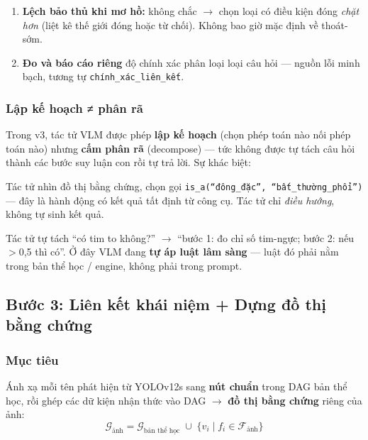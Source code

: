 \documentclass[11pt,a4paper]{article}
\begin{document}
\begin{enumerate}[leftmargin=1.5em]
  \item \textbf{Lệch bảo thủ khi mơ hồ:} không chắc $\to$ chọn loại có điều kiện đóng \emph{chặt hơn} (liệt kê thế giới đóng hoặc từ chối). Không bao giờ mặc định về thoát-sớm.
  \item \textbf{Đo và báo cáo riêng} độ chính xác phân loại loại câu hỏi --- nguồn lỗi minh bạch, tương tự \texttt{chính\_xác\_liên\_kết}.
\end{enumerate}

\subsubsection{Lập kế hoạch ≠ phân rã}
Trong v3, tác tử VLM được phép \textbf{lập kế hoạch} (chọn phép toán nào nối phép toán nào) nhưng \textbf{cấm phân rã} (decompose) --- tức không được tự tách câu hỏi thành các bước suy luận con rồi tự trả lời. Sự khác biệt:

\begin{description}[leftmargin=1.5em, style=nextline]
  \item[Lập kế hoạch trên đồ thị (CHO PHÉP)]
  Tác tử nhìn đồ thị bằng chứng, chọn gọi \texttt{is\_a(``đông\_đặc'', ``bất\_thường\_phổi'')} --- đây là hành động có kết quả tất định từ công cụ. Tác tử chỉ \emph{điều hướng}, không tự sinh kết quả.

  \item[Phân rã câu hỏi (CẤM)]
  Tác tử tự tách ``có tim to không?'' $\to$ ``bước 1: đo chỉ số tim-ngực; bước 2: nếu $>$0,5 thì có''. Ở đây VLM đang \textbf{tự áp luật lâm sàng} --- luật đó phải nằm trong bản thể học / engine, không phải trong prompt.
\end{description}


\subsection{Bước 3: Liên kết khái niệm + Dựng đồ thị bằng chứng}

\subsubsection{Mục tiêu}
Ánh xạ mỗi tên phát hiện từ YOLOv12s sang \textbf{nút chuẩn} trong DAG bản thể học, rồi ghép các dữ kiện nhận thức vào DAG $\to$ \textbf{đồ thị bằng chứng} riêng của ảnh:
\[
\mathcal{G}_\text{ảnh} = \mathcal{G}_\text{bản thể học} \;\cup\; \{v_i \mid f_i \in \mathcal{F}_\text{ảnh}\}
\]
\end{document}
